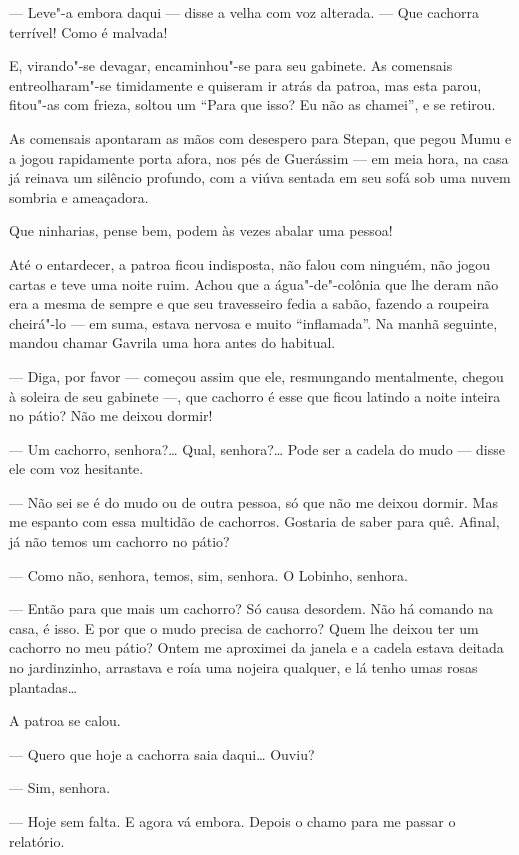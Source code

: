 --- Leve"-a embora daqui --- disse a velha com voz alterada. --- Que
cachorra terrível! Como é malvada!

E, virando"-se devagar, encaminhou"-se para seu gabinete. As comensais
entreolharam"-se timidamente e quiseram ir atrás da patroa, mas esta
parou, fitou"-as com frieza, soltou um ``Para que isso? Eu não as
chamei'', e se retirou.

As comensais apontaram as mãos com desespero para Stepan, que pegou Mumu
e a jogou rapidamente porta afora, nos pés de Guerássim --- em meia
hora, na casa já reinava um silêncio profundo, com a viúva sentada em
seu sofá sob uma nuvem sombria e ameaçadora.

Que ninharias, pense bem, podem às vezes abalar uma pessoa!

Até o entardecer, a patroa ficou indisposta, não falou com ninguém, não
jogou cartas e teve uma noite ruim. Achou que a água"-de"-colônia que lhe
deram não era a mesma de sempre e que seu travesseiro fedia a sabão,
fazendo a roupeira cheirá"-lo --- em suma, estava nervosa e muito
``inflamada''. Na manhã seguinte, mandou chamar Gavrila uma hora antes
do habitual.

--- Diga, por favor --- começou assim que ele, resmungando mentalmente,
chegou à soleira de seu gabinete ---, que cachorro é esse que ficou
latindo a noite inteira no pátio? Não me deixou dormir!

--- Um cachorro, senhora?\ldots{} Qual, senhora?\ldots{} Pode ser a cadela do mudo
--- disse ele com voz hesitante.

--- Não sei se é do mudo ou de outra pessoa, só que não me deixou
dormir. Mas me espanto com essa multidão de cachorros. Gostaria de saber
para quê. Afinal, já não temos um cachorro no pátio?

--- Como não, senhora, temos, sim, senhora. O Lobinho, senhora.

--- Então para que mais um cachorro? Só causa desordem. Não há comando
na casa, é isso. E por que o mudo precisa de cachorro? Quem lhe deixou
ter um cachorro no meu pátio? Ontem me aproximei da janela e a cadela
estava deitada no jardinzinho, arrastava e roía uma nojeira qualquer, e
lá tenho umas rosas plantadas\ldots{}

A patroa se calou.

--- Quero que hoje a cachorra saia daqui\ldots{} Ouviu?

--- Sim, senhora.

--- Hoje sem falta. E agora vá embora. Depois o chamo para me passar o
relatório.

